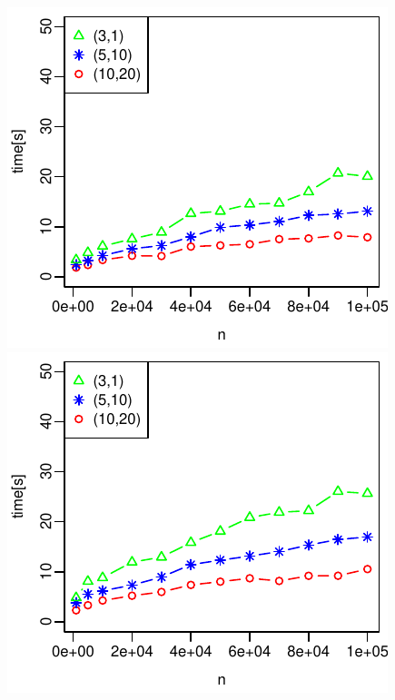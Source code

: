 \documentclass{article}
\begin{document}
\includegraphics{test_series_d_in_const_all_dyn_hashmap.pdf}
\includegraphics{test_series_d_in_const_all_dyn_treemap.pdf}
\end{document}
